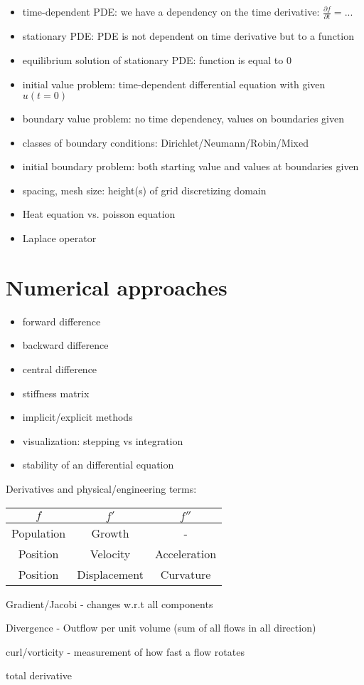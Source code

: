 \begin{itemize}
	\item time-dependent PDE: we have a dependency on the time derivative: $\frac{\partial f}{\partial t} = ...$
	\item stationary PDE: PDE is not dependent on time derivative but to a function 
	\item equilibrium solution of stationary PDE: function is equal to 0
	\item initial value problem: time-dependent differential equation with given $u(t=0)$
	\item boundary value problem: no time dependency, values on boundaries given
	\item classes of boundary conditions: Dirichlet/Neumann/Robin/Mixed
	\item initial boundary problem: both starting value and values at boundaries given
	\item spacing, mesh size: height(s) of grid discretizing domain
	\item Heat equation vs. poisson equation
	\item Laplace operator
\end{itemize}

\section{Numerical approaches}
\begin{itemize}
	\item forward difference
	\item backward difference
	\item central difference 
	\item stiffness matrix
	\item implicit/explicit methods
	\item visualization: stepping vs integration
	\item stability of an differential equation
\end{itemize}

Derivatives and physical/engineering  terms: 

\begin{tabular}{c|c|c}
	$f$ & $f'$ & $f''$ \\
	\hline
	Population & Growth & - \\ 
	\hline
	Position & Velocity & Acceleration \\
	\hline
	Position & Displacement & Curvature
\end{tabular}

Gradient/Jacobi - changes w.r.t all components

Divergence - Outflow per unit volume (sum of all flows in all direction)

curl/vorticity - measurement of how fast a flow rotates

total derivative

